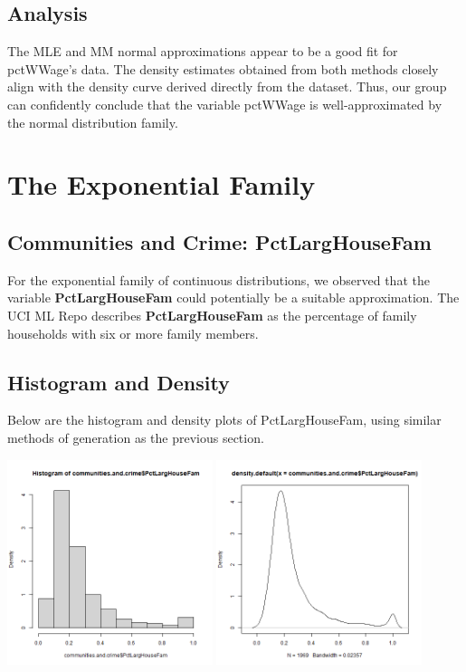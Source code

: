 \documentclass[12pt, letterpaper]{report}
\begin{document}
\section{Analysis}
The MLE and MM normal approximations appear to be a good fit for pctWWage's data. The density estimates obtained from both methods closely align with the density curve derived directly from the dataset. 
Thus, our group can confidently conclude that the variable pctWWage is well-approximated by the normal distribution family.



\maketitle
\chapter{The Exponential Family}
\section{Communities and Crime: PctLargHouseFam}

For the exponential family of continuous distributions, we observed that the variable \textbf{PctLargHouseFam} could potentially be a suitable approximation. 
The UCI ML Repo describes \textbf{PctLargHouseFam} as the percentage of family households with six or more family members. 

\section{Histogram and Density}
Below are the histogram and density plots of PctLargHouseFam, using similar methods of generation as the previous section.
\begin{center}
\includegraphics[width=0.45\textwidth]{exponential/PctLargHouseFam_hist}
\includegraphics[width=0.45\textwidth]{exponential/PctLargHouseFam_density}
\end{center}
\end{document}
